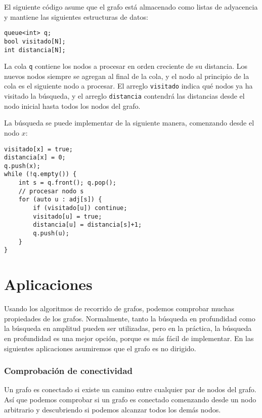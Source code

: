 El siguiente código asume que el grafo está almacenado
como listas de adyacencia y mantiene las siguientes
estructuras de datos:
\begin{lstlisting}
queue<int> q;
bool visitado[N];
int distancia[N];
\end{lstlisting}

La cola \texttt{q}
contiene los nodos a procesar
en orden creciente de su distancia.
Los nuevos nodos siempre se agregan al final
de la cola, y el nodo al principio
de la cola es el siguiente nodo a procesar.
El arreglo \texttt{visitado} indica
qué nodos ya ha visitado la búsqueda,
y el arreglo \texttt{distancia} contendrá las
distancias desde el nodo inicial hasta todos los nodos del grafo.

La búsqueda se puede implementar de la siguiente manera,
comenzando desde el nodo $x$:
\begin{lstlisting}
visitado[x] = true;
distancia[x] = 0;
q.push(x);
while (!q.empty()) {
    int s = q.front(); q.pop();
    // procesar nodo s
    for (auto u : adj[s]) {
        if (visitado[u]) continue;
        visitado[u] = true;
        distancia[u] = distancia[s]+1;
        q.push(u);
    }
}
\end{lstlisting}

\section{Aplicaciones}

Usando los algoritmos de recorrido de grafos,
podemos comprobar muchas propiedades de los grafos.
Normalmente, tanto la búsqueda en profundidad como
la búsqueda en amplitud pueden ser utilizadas,
pero en la práctica, la búsqueda en profundidad
es una mejor opción, porque es
más fácil de implementar.
En las siguientes aplicaciones asumiremos que el grafo es no dirigido.

\subsubsection{Comprobación de conectividad}


Un grafo es conectado si existe un camino
entre cualquier par de nodos del grafo.
Así que podemos comprobar si un grafo es conectado
comenzando desde un nodo arbitrario y
descubriendo si podemos alcanzar todos los demás nodos.

